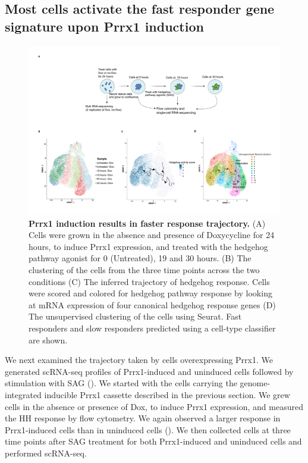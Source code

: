 \subsection{Most cells activate the fast responder gene signature upon Prrx1 induction}
\begin{figure}[t!]  
    \centering
    \includegraphics[width=\linewidth]{figures/hedgehog/hh_figure4.png}
    \caption[Prrx1 induction results in faster response trajectory.]{%
        \textbf{Prrx1 induction results in faster response trajectory.} (A) Cells were grown in the absence and presence of Doxycycline for 24 hours, to induce Prrx1 expression, and treated with the hedgehog pathway agonist for 0 (Untreated), 19 and 30 hours. (B) The clustering of the cells from the three time points across the two conditions (C) The inferred trajectory of hedgehog response. Cells were scored and colored for hedgehog pathway response by looking at mRNA expression of four canonical hedgehog response genes (D) The unsupervised clustering of the cells using Seurat. Fast responders and slow responders predicted using a cell-type classifier are shown.
    }
    \label{fig:hh_figure4}
\end{figure}
We next examined the trajectory taken by cells overexpressing Prrx1. We generated scRNA-seq profiles of Prrx1-induced and uninduced cells followed by stimulation with SAG (). We started with the cells carrying the genome-integrated inducible Prrx1 cassette described in the previous section. We grew cells in the absence or presence of Dox, to induce Prrx1 expression, and measured the HH response by flow cytometry. We again observed a larger response in Prrx1-induced cells than in uninduced cells (). We then collected cells at three time points after SAG treatment for both Prrx1-induced and uninduced cells and performed scRNA-seq.

